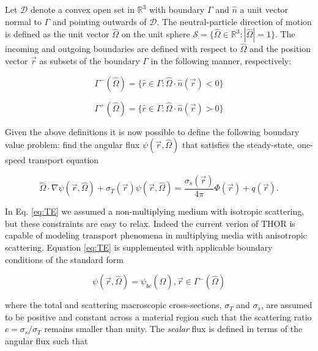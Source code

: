 Let \( \mathcal{D} \) denote a convex open set in $\mathbb{R}^3$ with boundary $\Gamma$ and $\hat{n}$ a unit vector normal to $\Gamma$ and pointing outwards of \( \mathcal{D} \). The neutral-particle direction of motion is defined as the unit vector $\hat{\Omega}$ on the unit sphere $\mathcal{S} = \{ \hat{\Omega} \in \mathbb{R}^3:|\hat{\Omega}| = 1 \}$. The incoming and outgoing boundaries are defined with respect to $\hat{\Omega}$ and the position vector $\Vec{r}$ as subsets of the boundary $\Gamma$ in the following manner, respectively:

\begin{equation}
\Gamma^- (\hat{\Omega}) = \{ \hat{r} \in \Gamma : \hat{\Omega} \cdot \hat{n}(\Vec{r}) < 0 \}
\end{equation}

\begin{equation}
\Gamma^+ (\hat{\Omega}) = \{ \hat{r} \in \Gamma : \hat{\Omega} \cdot \hat{n}(\Vec{r}) > 0 \}
\end{equation}

Given the above definitions it is now possible to define the following boundary value problem: find the angular flux $\psi ( \Vec{r}, \hat{\Omega} )$ that satisfies the steady-state, one-speed transport equation

\begin{equation} \label{eq:TE}
\hat{\Omega} \cdot \nabla \psi ( \Vec{r} , \hat{\Omega} ) + \sigma _T ( \Vec{r} ) \psi ( \Vec{r} , \hat{\Omega} ) = \frac{\sigma_s (\Vec{r})}{4 \pi} \Phi ( \Vec{r} ) + q ( \Vec{r} ) .
\end{equation}

In Eq. \ref{eq:TE} we assumed a non-multiplying medium with isotropic scattering, but these constraints are easy to relax. Indeed the current verion of THOR is capable of modeling transport phenomena in multiplying media with anisotropic scattering. Equation \ref{eq:TE} is supplemented with applicable boundary conditions of the standard form

\begin{equation}
    \psi ( \Vec{r} , \hat{\Omega} ) = \psi_{bc} ( \hat{\Omega} ) , \Vec{r} \in \Gamma^- ( \hat{\Omega} )
\end{equation}

\noindent where the total and scattering macroscopic cross-sections, $\sigma_T$ and $\sigma_s$, are assumed to be positive and constant across a material region such that the scattering ratio $c = \sigma_s / \sigma_T $ remains smaller than unity. The \textit{scalar} flux is defined in terms of the angular flux such that

